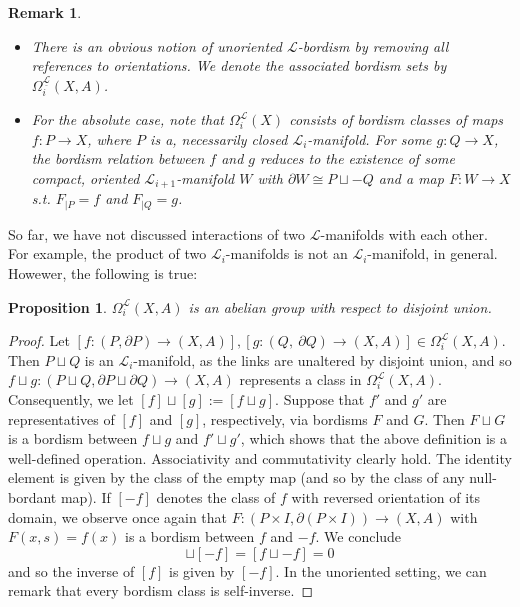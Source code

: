 \documentclass[11pt]{book}
\newtheorem{prop}{Proposition}
\newtheorem{remark}{Remark}
\begin{document}
\begin{remark}
\begin{itemize}
\item[1.] There is an obvious notion of unoriented $\mathcal{L}$-bordism by removing all references to orientations. We denote the associated bordism sets by $\Omega_i^{\underline{\mathcal{L}}}(X,A)$.
\item[2.] For the absolute case, note that $\Omega_i^{\mathcal{L}}(X)$ consists of bordism classes of maps $f: P \to X$, where $P$ is a, necessarily closed $\mathcal{L}_i$-manifold. For some $g: Q \to X$, the bordism relation between $f$ and $g$ reduces to the existence of some compact, oriented $\mathcal{L}_{i+1}$-manifold $W$ with $\partial W \cong P \sqcup -Q$ and a map $F: W \to X$ s.t. $F_{|P}=f$ and $F_{|Q}=g$.
\end{itemize}
\end{remark}

So far, we have not discussed interactions of two $\mathcal{L}$-manifolds with each other. For example, the product of two $\mathcal{L}_i$-manifolds is not an $\mathcal{L}_i$-manifold, in general. Howewer, the following is true:

\begin{prop}
$\Omega_i^{\mathcal{L}}(X,A)$ is an abelian group with respect to disjoint union.
\end{prop}

\begin{proof}
Let $[f: (P, \partial P) \to (X,A)], [g: (Q,\ \partial Q) \to (X,A)] \in \Omega_i^{\mathcal{L}}(X,A)$. Then $P \sqcup Q$ is an $\mathcal{L}_i$-manifold, as the links are unaltered by disjoint union, and so $f \sqcup g: (P \sqcup Q, \partial P \sqcup \partial Q) \to (X,A)$ represents a class in $\Omega_i^{\mathcal{L}}(X,A)$. Consequently, we let $[f] \sqcup [g]:= [f \sqcup g]$. Suppose that $f'$ and $g'$ are representatives of $[f]$ and $[g]$, respectively, via bordisms $F$ and $G$. Then $F \sqcup G$ is a bordism between $f \sqcup g$ and $f' \sqcup g'$, which shows that the above definition is a well-defined operation. Associativity and commutativity clearly hold. The identity element is given by the class of the empty map (and so by the class of any null-bordant map). If $[-f]$ denotes the class of $f$ with reversed orientation of its domain, we observe once again that $F: (P \times I, \partial(P \times I)) \to (X,A)$ with $F(x,s)=f(x)$ is a bordism between $f$ and $-f$. We conclude
\begin{equation*}
[f] \sqcup [-f] = [f \sqcup -f] = 0 
\end{equation*}
and so the inverse of $[f]$ is given by $[-f]$. In the unoriented setting, we can remark that every bordism class is self-inverse.
\end{proof}
\end{document}
